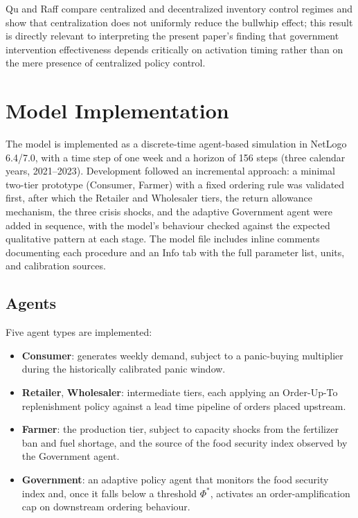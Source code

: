 \documentclass[final,onefignum,onetabnum]{siuro250211}
\begin{document}
Qu and Raff \cite{QuRaff2017} compare centralized and decentralized inventory control regimes and
show that centralization does not uniformly reduce the bullwhip effect; this result is directly
relevant to interpreting the present paper's finding that government intervention effectiveness
depends critically on activation timing rather than on the mere presence of centralized policy
control.

\section{Model Implementation}
\label{sec:model}

The model is implemented as a discrete-time agent-based simulation in NetLogo 6.4/7.0, with a time
step of one week and a horizon of 156 steps (three calendar years, 2021--2023). Development
followed an incremental approach: a minimal two-tier prototype (Consumer, Farmer) with a fixed
ordering rule was validated first, after which the Retailer and Wholesaler tiers, the return
allowance mechanism, the three crisis shocks, and the adaptive Government agent were added in
sequence, with the model's behaviour checked against the expected qualitative pattern at each
stage. The model file includes inline comments documenting each procedure and an Info tab with
the full parameter list, units, and calibration sources.

\subsection{Agents}

Five agent types are implemented:

\begin{itemize}
\item \textbf{Consumer}: generates weekly demand, subject to a panic-buying multiplier during the
historically calibrated panic window.
\item \textbf{Retailer}, \textbf{Wholesaler}: intermediate tiers, each applying an Order-Up-To
replenishment policy against a lead time pipeline of orders placed upstream.
\item \textbf{Farmer}: the production tier, subject to capacity shocks from the fertilizer ban and
fuel shortage, and the source of the food security index observed by the Government agent.
\item \textbf{Government}: an adaptive policy agent that monitors the food security index and, once
it falls below a threshold $\Phi^{*}$, activates an order-amplification cap on downstream
ordering behaviour.
\end{itemize}
\end{document}
